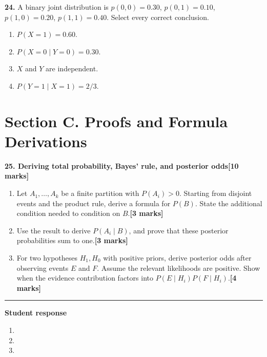 \documentclass[11pt,a4paper]{article}
\newlength{\BlankAnswerHeight}\setlength{\BlankAnswerHeight}{16mm}
\newcommand{\AnswerBlank}{\leavevmode\par\vspace{\BlankAnswerHeight}}
\begin{document}
\par\noindent\begin{minipage}{\linewidth}
\textbf{24.} A binary joint distribution is \(p(0,0)=0.30\), \(p(0,1)=0.10\), \(p(1,0)=0.20\), \(p(1,1)=0.40\). Select every correct conclusion.
\begin{enumerate}[label=(\Alph*),leftmargin=8mm,itemsep=2pt,topsep=2pt]
\item \(P(X=1)=0.60\).
\item \(P(X=0\mid Y=0)=0.30\).
\item \(X\) and \(Y\) are independent.
\item \(P(Y=1\mid X=1)=2/3\).
\end{enumerate}

\end{minipage}\par\vspace{3mm}
\newpage\section*{Section C. Proofs and Formula Derivations}
\textbf{25. Deriving total probability, Bayes' rule, and posterior odds}\hfill\textbf{[10 marks]}\par\medskip
\begin{enumerate}[label=(\alph*),leftmargin=8mm,itemsep=3pt]
\item Let \(A_1,\ldots,A_k\) be a finite partition with \(P(A_i)>0\). Starting from disjoint events and the product rule, derive a formula for \(P(B)\). State the additional condition needed to condition on \(B\).\hfill\textbf{[3 marks]}
\item Use the result to derive \(P(A_i\mid B)\), and prove that these posterior probabilities sum to one.\hfill\textbf{[3 marks]}
\item For two hypotheses \(H_1,H_0\) with positive priors, derive posterior odds after observing events \(E\) and \(F\). Assume the relevant likelihoods are positive. Show when the evidence contribution factors into \(P(E\mid H_i)P(F\mid H_i)\).\hfill\textbf{[4 marks]}
\end{enumerate}\par\medskip\hrule\medskip\textbf{Student response}\par
\begin{enumerate}[label=(\alph*),leftmargin=8mm,itemsep=3pt]
\item
\AnswerBlank
\item
\AnswerBlank
\item
\AnswerBlank
\end{enumerate}
\end{document}

